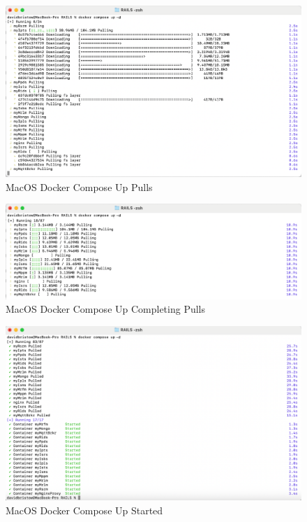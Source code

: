 \begin{figure}[H]
    \centering
    \includegraphics[scale=0.4]{../Images/dc-up-progress1-mac.png}
    \caption{MacOS Docker Compose Up Pulls}
    \label{fig:mac-docker-compose-up1}
\end{figure}
\begin{figure}[H]
    \centering
    \includegraphics[scale=0.4]{../Images/dc-up-progress2-mac.png}
    \caption{MacOS Docker Compose Up Completing Pulls}
    \label{fig:mac-docker-compose-up2}
\end{figure}
\begin{figure}[H]
    \centering
    \includegraphics[scale=0.4]{../Images/dc-up-progress3-mac.png}
    \caption{MacOS Docker Compose Up Started}
    \label{fig:mac-docker-compose-up3}
\end{figure}
